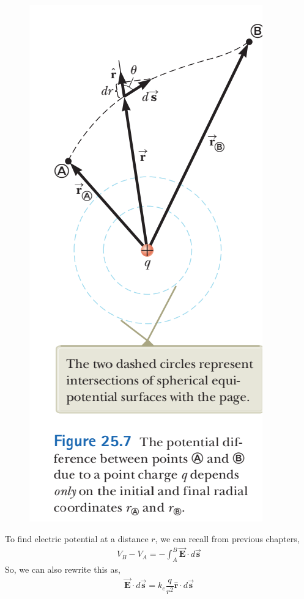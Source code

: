 \documentclass[12pt, titlepage, oneside]{article}
\let\oldhat\hat
\let\oldvec\vec
\renewcommand{\hat}[1]{\oldhat{\mathbf{#1}}}
\renewcommand{\vec}[1]{\oldvec{\bm{#1}}}
\renewcommand{\hat}[1]{\oldhat{\bm{#1}}}
\begin{document}
\begin{figure}
	\begin{center}
		\vspace{-2cm}
		\includegraphics[scale=1]{3.png}
	\end{center}
\end{figure} 
To find electric potential at a distance $r$, we can recall from previous chapters,
\begin{align*}
V_B - V_A = - \int_A^B \vec{E} \cdot d\vec{s}
\end{align*}
So, we can also rewrite this as,
\begin{align*}
\vec{E} \cdot d \vec{s} = k_e \dfrac{q}{r^2}\hat{r} \cdot d \vec{s}
\end{align*}
\end{document}
